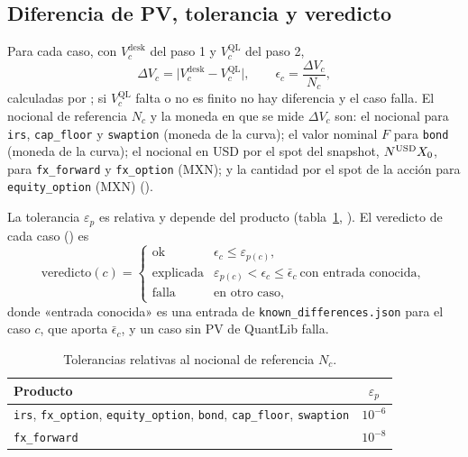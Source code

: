 \subsection{Diferencia de PV, tolerancia y veredicto}\label{sec:cap12-diferencia}

Para cada caso, con $V^{\mathrm{desk}}_c$ del paso 1 y $V^{\mathrm{QL}}_c$ del paso 2,
\begin{equation}\label{eq:cap12-diferencia}
  \Delta V_c = \bigl|V^{\mathrm{desk}}_c - V^{\mathrm{QL}}_c\bigr|, \qquad
  \epsilon_c = \frac{\Delta V_c}{N_c},
\end{equation}
calculadas por ; si $V^{\mathrm{QL}}_c$ falta o no es finito no hay
diferencia y el caso falla. El nocional de referencia $N_c$ y la moneda en que se mide $\Delta V_c$ son:
el nocional para \texttt{irs}, \texttt{cap\_floor} y \texttt{swaption} (moneda de la curva); el valor nominal $F$ para
\texttt{bond} (moneda de la curva); el nocional en USD por el spot del snapshot, $N^{\mathrm{USD}}X_0$, para
\texttt{fx\_forward} y \texttt{fx\_option} (MXN); y la cantidad por el spot de la acción para
\texttt{equity\_option} (MXN) ().

La tolerancia $\varepsilon_p$ es relativa y depende del producto (tabla~\ref{tab:cap12-tolerancias},
). El veredicto de cada caso
() es
\begin{equation}\label{eq:cap12-veredicto}
  \text{veredicto}(c) =
  \begin{cases}
    \text{ok} & \epsilon_c \le \varepsilon_{p(c)},\\[2pt]
    \text{explicada} & \varepsilon_{p(c)} < \epsilon_c \le \bar\epsilon_c \ \text{con entrada conocida},\\[2pt]
    \text{falla} & \text{en otro caso,}
  \end{cases}
\end{equation}
donde «entrada conocida» es una entrada de \texttt{known\_differences.json} para el caso $c$, que aporta $\bar\epsilon_c$,
y un caso sin PV de QuantLib falla.

\begin{table}[ht]
\centering
\begin{tabular}{@{}lc@{}}
\toprule
Producto & $\varepsilon_p$ \\
\midrule
\texttt{irs}, \texttt{fx\_option}, \texttt{equity\_option}, \texttt{bond}, \texttt{cap\_floor}, \texttt{swaption} & $10^{-6}$ \\
\texttt{fx\_forward} & $10^{-8}$ \\
\bottomrule
\end{tabular}
\caption{Tolerancias relativas al nocional de referencia $N_c$.}\label{tab:cap12-tolerancias}
\end{table}


